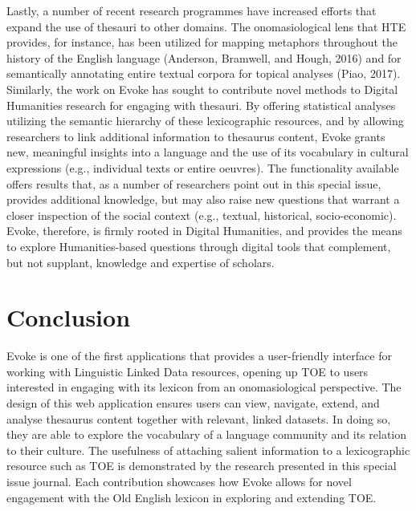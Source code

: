 Lastly, a number of recent research programmes have increased efforts that expand the use of thesauri to other domains. The onomasiological lens that HTE provides, for instance, has been utilized for mapping metaphors throughout the history of the English language (Anderson, Bramwell, and Hough, 2016) and for semantically annotating entire textual corpora for topical analyses (Piao, 2017).  Similarly, the work on Evoke has sought to contribute novel methods to Digital Humanities research for engaging with thesauri. By offering statistical analyses utilizing the semantic hierarchy of these lexicographic resources, and by allowing researchers to link additional information to thesaurus content, Evoke grants new, meaningful insights into a language and the use of its vocabulary in cultural expressions (e.g., individual texts or entire oeuvres). The functionality available offers results that, as a number of researchers point out in this special issue, provides additional knowledge, but may also raise new questions that warrant a closer inspection of the social context (e.g., textual, historical, socio-economic). Evoke, therefore, is firmly rooted in Digital Humanities, and provides the means to explore Humanities-based questions through digital tools that complement, but not supplant, knowledge and expertise of scholars.

\section{Conclusion}

Evoke is one of the first applications that provides a user-friendly interface for working with Linguistic Linked Data resources, opening up TOE to users interested in engaging with its lexicon from an onomasiological perspective. The design of this web application ensures users can view, navigate, extend, and analyse thesaurus content together with relevant, linked datasets. In doing so, they are able to explore the vocabulary of a language community and its relation to their culture. The usefulness of attaching salient information to a lexicographic resource such as TOE is demonstrated by the research presented in this special issue journal. Each contribution showcases how Evoke allows for novel engagement with the Old English lexicon in exploring and extending TOE. 

